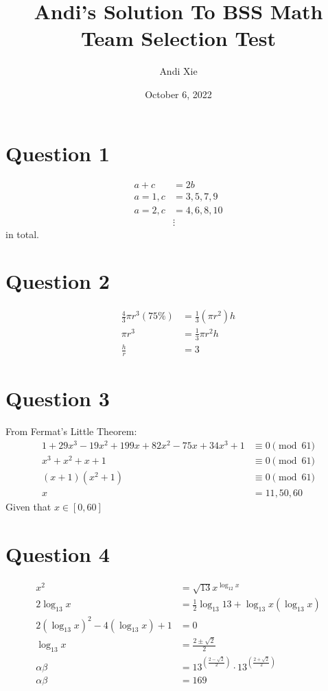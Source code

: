 \documentclass{article}
\title{Andi's Solution To BSS Math Team Selection Test}
\author{Andi Xie}
\date{October 6, 2022}
\begin{document}
\maketitle


\section*{Question 1}
\begin{align*}
    a+c&=2b\\
    a=1,c&=3,5,7,9\\
    a=2,c&=4,6,8,10\\
    &\vdots
\end{align*}
 in total.


\section*{Question 2}
\begin{align*}
    \frac 43\pi r^3\left(75\%\right)&=\frac 13\left(\pi r^2\right)h\\
    \pi r^3&=\frac 13 \pi r^2h\\
    \frac hr&=\boxed{3}
\end{align*}



\section*{Question 3}
From Fermat's Little Theorem:
\begin{align*}
    1+29x^3-19x^2+199x+82x^2-75x+34x^3+1&\equiv 0\pmod{61}\\
    x^3+x^2+x+1&\equiv 0\pmod{61}\\
    (x+1)\left(x^2+1\right)&\equiv 0\pmod{61}\\
    x&=\boxed{11,50,60}
\end{align*}
Given that $x\in [0,60]$


\section*{Question 4}
\begin{align*}
    x^2&=\sqrt{13}x^{\log_{12}x}\\
    2\log_{13}x&=\frac 12\log_{13}13+\log_{13}x\left(\log_{13}x\right)\\
    2\left(\log_{13}x\right)^2-4\left(\log_{13}x\right)+1&=0\\
    \log_{13}x&=\frac{2\pm\sqrt 2}{2}\\
    \alpha\beta&=13^{\left(\frac{2-\sqrt 2}{2}\right)}\cdot 13^{\left(\frac{2+\sqrt 2}{2}\right)}\\
    \alpha\beta&=\boxed{169}
\end{align*}
\end{document}
